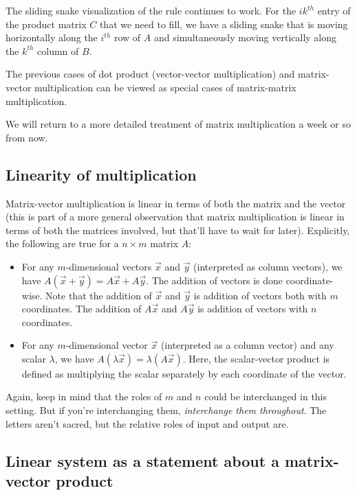 \documentclass[10pt]{amsart}
\begin{document}
The sliding snake visualization of the rule continues to work. For the
$ik^{th}$ entry of the product matrix $C$ that we need to fill, we
have a sliding snake that is moving horizontally along the $i^{th}$
row of $A$ and simultaneously moving vertically along the $k^{th}$
column of $B$.

The previous cases of dot product (vector-vector multiplication) and
matrix-vector multiplication can be viewed as special cases of
matrix-matrix multiplication.

We will return to a more detailed treatment of matrix multiplication a
week or so from now.

\subsection{Linearity of multiplication}

Matrix-vector multiplication is linear in terms of both the matrix and
the vector (this is part of a more general observation that matrix
multiplication is linear in terms of both the matrices involved, but
that'll have to wait for later). Explicitly, the following are true
for a $n \times m$ matrix $A$:

\begin{itemize}
\item For any $m$-dimensional vectors $\vec{x}$ and $\vec{y}$
  (interpreted as column vectors), we have $A(\vec{x} + \vec{y}) =
  A\vec{x} + A\vec{y}$. The addition of vectors is done
  coordinate-wise. Note that the addition of $\vec{x}$ and $\vec{y}$
  is addition of vectors both with $m$ coordinates. The addition of
  $A\vec{x}$ and $A\vec{y}$ is addition of vectors with $n$
  coordinates.
\item For any $m$-dimensional vector $\vec{x}$ (interpreted as a
  column vector) and any scalar $\lambda$, we have $A(\lambda \vec{x})
  = \lambda(A \vec{x})$. Here, the scalar-vector product is defined as
  multiplying the scalar separately by each coordinate of the vector.
\end{itemize}

Again, keep in mind that the roles of $m$ and $n$ could be
interchanged in this setting. But if you're interchanging them, {\em
  interchange them throughout}. The letters aren't sacred, but the
relative roles of input and output are.

\subsection{Linear system as a statement about a matrix-vector product}
\end{document}
